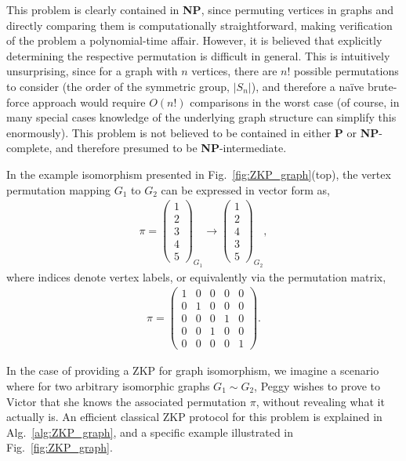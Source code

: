 This problem is clearly contained in \textbf{NP}, since permuting vertices in graphs and directly comparing them is computationally straightforward, making verification of the problem a polynomial-time affair. However, it is believed that explicitly determining the respective permutation is difficult in general. This is intuitively unsurprising, since for a graph with $n$ vertices, there are $n!$ possible permutations to consider (the order of the symmetric group, $|S_n|$), and therefore a na{\" i}ve brute-force approach would require $O(n!)$ comparisons in the worst case (of course, in many special cases knowledge of the underlying graph structure can simplify this enormously). This problem is not believed to be contained in either \textbf{P} or \textbf{NP}-complete, and therefore presumed to be \textbf{NP}-intermediate.

In the example isomorphism presented in Fig.~\ref{fig:ZKP_graph}(top), the vertex permutation mapping $G_1$ to $G_2$ can be expressed in vector form as,
\begin{align}
\pi = \begin{pmatrix}
	1 \\
	2 \\
	3 \\
	4 \\
	5
\end{pmatrix}_{G_1} \to \begin{pmatrix}
	1 \\
	2 \\
	4 \\
	3 \\
	5
\end{pmatrix}_{G_2},
\end{align}
where indices denote vertex labels, or equivalently via the permutation matrix,
\begin{align}
\pi = \begin{pmatrix}
	1 & 0 & 0 & 0 & 0 \\
	0 & 1 & 0 & 0 & 0 \\
	0 & 0 & 0 & 1 & 0 \\
	0 & 0 & 1 & 0 & 0 \\
	0 & 0 & 0 & 0 & 1
\end{pmatrix}.
\end{align}

In the case of providing a ZKP for graph isomorphism, we imagine a scenario where for two arbitrary isomorphic graphs \mbox{$G_1\sim G_2$}, Peggy wishes to prove to Victor that she knows the associated permutation $\pi$, without revealing what it actually is. An efficient classical ZKP protocol for this problem is explained in Alg.~\ref{alg:ZKP_graph}, and a specific example illustrated in Fig.~\ref{fig:ZKP_graph}.

